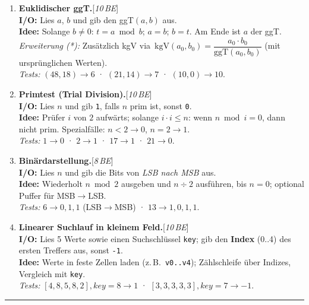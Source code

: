 \documentclass[11pt,a4paper]{scrartcl}
\newenvironment{aufgaben}{%
  \begin{enumerate}[leftmargin=*,label=\textbf{Aufgabe~\arabic*:}, itemsep=0.6em]
  }{\end{enumerate}}
\newcommand{\punkte}[1]{\hfill{\small[\textit{#1\,BE}]}}%
\begin{document}
  \begin{aufgaben}

    \item \textbf{Euklidischer ggT.}\punkte{10}\\
    \textbf{I/O:} Lies $a$, $b$ und gib den ggT$(a,b)$ aus.\\
    \textbf{Idee:} Solange $b \ne 0$: $t = a \bmod b$; $a=b$; $b=t$. Am Ende ist $a$ der ggT.\\
    \emph{Erweiterung (*):} Zusätzlich kgV via $\,\mathrm{kgV}(a_0,b_0)=\dfrac{a_0\cdot b_0}{\mathrm{ggT}(a_0,b_0)}$ (mit ursprünglichen Werten).\\
    \emph{Tests:} $(48,18)\to 6$ \;·\; $(21,14)\to 7$ \;·\; $(10,0)\to 10$.

    \item \textbf{Primtest (Trial Division).}\punkte{10}\\
    \textbf{I/O:} Lies $n$ und gib \texttt{1}, falls $n$ prim ist, sonst \texttt{0}.\\
    \textbf{Idee:} Prüfer $i$ von $2$ aufwärts; solange $i\cdot i \le n$: wenn $n \bmod i = 0$, dann nicht prim. Spezialfälle: $n<2 \to 0$, $n=2 \to 1$.\\
    \emph{Tests:} $1\to 0$ \;·\; $2\to 1$ \;·\; $17\to 1$ \;·\; $21\to 0$.

    \item \textbf{Binärdarstellung.}\punkte{8}\\
    \textbf{I/O:} Lies $n$ und gib die Bits von \emph{LSB nach MSB} aus.\\
    \textbf{Idee:} Wiederholt $n \bmod 2$ ausgeben und $n \div 2$ ausführen, bis $n=0$; optional Puffer für MSB$\to$LSB.\\
    \emph{Tests:} $6\to 0,1,1$ (LSB$\to$MSB) \;·\; $13\to 1,0,1,1$.

    \item \textbf{Linearer Suchlauf in kleinem Feld.}\punkte{10}\\
    \textbf{I/O:} Lies 5 Werte sowie einen Suchschlüssel \texttt{key}; gib den \textbf{Index} (0..4) des ersten Treffers aus, sonst \texttt{-1}.\\
    \textbf{Idee:} Werte in feste Zellen laden (z.\,B.\ \texttt{v0..v4}); Zählschleife über Indizes, Vergleich mit \texttt{key}.\\
    \emph{Tests:} $[4,8,5,8,2], key=8 \to 1$ \;·\; $[3,3,3,3,3], key=7 \to -1$.

  \end{aufgaben}

  \vspace{0.3em}
  \hrule
  \vspace{0.6em}
\end{document}
